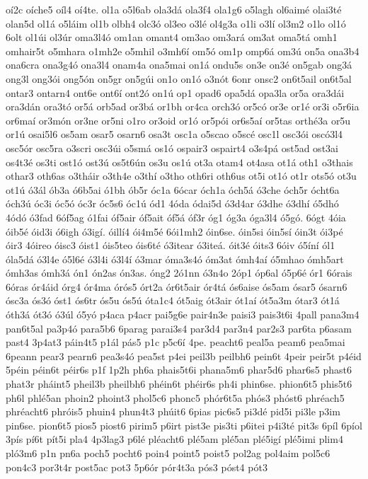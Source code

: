 {oí2c
oíche5
oíl4
oí4te.
ol1a
o5l6ab
ola3dá
ola3f4
ola1g6
o5lagh
ol6aimé
olai3té
olan5d
ol1á
o5láim
ol1b
olbh4
olc3ó
ol3eo
o3lé
ol4g3a
o1li
o3lí
ol3m2
o1lo
ol1ó
6olt
ol1úi
ol3úr
oma3l4ó
om1an
omant4
om3ao
om3ará
om3at
oma5tá
omh1
omhair5t
o5mhara
o1mh2e
o5mhil
o3mh6í
om5ó
om1p
omp6á
om3ú
on5a
ona3b4
ona6cra
ona3g4ó
ona3l4
onam4a
ona5mai
on1á
ondu5s
on3e
on3é
on5gab
ong3á
ong3l
ong3ói
ong5ón
on5gr
on5gúi
on1o
on1ó
o3nót
6onr
onsc2
on6t5ail
on6t5al
ontar3
ontarn4
ont6e
ont6í
ont2ó
on1ú
op1
opad6
opa5dá
opa3la
or5a
ora3dái
ora3dán
ora3tó
or5á
orb5ad
or3bá
or1bh
or4ca
orch3ó
or5có
or3e
or1é
or3i
o5r6ia
or6maí
or3món
or3ne
or5ni
o1ro
or3oid
or1ó
or5pói
or6s5aí
or5tas
orthé3a
or5u
or1ú
osai5l6
os5am
osar5
osarn6
osa3t
osc1a
o5scao
o5scé
osc1l
osc3ói
oscó3l4
osc5ór
osc5ra
o3scri
osc3úi
o5smá
os1ó
ospair3
ospairt4
o3s4pá
ost5ad
ost3ai
os4t3é
os3ti
ost1ó
ost3ú
os5t6ún
os3u
os1ú
ot3a
otam4
ot4asa
ot1á
oth1
o3thais
othar3
oth6as
o3tháir
o3th4e
o3thí
o3tho
oth6ri
oth6us
ot5i
ot1ó
ot1r
ots5ó
ot3u
ot1ú
ó3ál
ób3a
ó6b5ai
ó1bh
ób5r
óc1a
6ócar
óch1a
óch5á
ó3che
óch5r
ócht6a
óch3ú
óc3i
óc5ó
óc3r
óc5s6
óc1ú
ód1
4óda
ódai5d
ó3d4ar
ó3dhe
ó3dhí
ó5dhó
4ódó
ó3fad
6óf5ag
ó1fai
óf5air
óf5ait
óf5á
óf3r
óg1
óg3a
óga3l4
ó5gó.
6ógt
4óia
óib5é
óid3i
ó6igh
ó3igí.
óillí4
ói4m5é
6ói1mh2
óin6se.
óin5si
óin5sí
óin3t
ói3pé
óir3
4óireo
óisc3
óist1
óis5teo
óis6té
ó3itear
ó3iteá.
óit3é
óits3
6óiv
ó5íní
ól1
óla5dá
ó3l4e
ó5l6é
ó3l4i
ó3l4í
ó3mar
óma3s4ó
óm3at
ómh4aí
ó5mhao
ómh5art
ómh3as
ómh3á
ón1
ón2as
ón3as.
óng2
2ó1nn
ó3n4o
2óp1
óp6al
ó5p6é
ór1
6órais
6óras
ór4áid
órg4
ór4ma
órós5
órt2a
ór6t5air
ór4tá
ós6aise
ós5am
ósar5
ósarn6
ósc3a
ós3ó
óst1
ós6tr
ós5u
ós5ú
óta1c4
ót5aig
ót3air
ót1aí
ót5a3m
ótar3
ót1á
óth3á
ót3ó
ó3úl
ó5yó
p4aca
p4acr
pai5g6e
pair4n3e
paisi3
pais3t6i
4pall
pana3m4
pan6t5al
pa3p4ó
para5b6
6parag
parai3s4
par3d4
par3n4
par2s3
par6ta
p6asam
past4
3p4at3
páin4t5
p1ál
pás5
p1c
p5c6í
4pe.
peacht6
peal5a
peam6
pea5mai
6peann
pear3
pearn6
pea3s4ó
pea5st
p4ei
peil3b
peilbh6
pein6t
4peir
peir5t
p4éid
5péin
péin6t
péir6s
p1f
1p2h
ph6a
phais5t6i
phana5m6
phar5d6
phar6s5
phast6
phat3r
pháint5
pheil3b
pheilbh6
phéin6t
phéir6s
ph4i
phin6se.
phion6t5
phis5t6
ph6l
phlé5an
phoin2
phoint3
phol5c6
phonc5
phór6t5a
phós3
phóst6
phréach5
phréacht6
phróis5
phuin4
phun4t3
phúit6
6pias
pic6s5
pi3dé
pid5i
pi3le
p3im
pin6se.
pion6t5
pios5
piost6
pirim5
p6irt
pist3e
pis3ti
p6itei
p4i3té
pit3s
6píl
6píol
3pís
pí6t
pít5i
pla4
4p3lag3
p6lé
pléacht6
plé5am
plé5an
plé5igí
plé5imi
plim4
pló3m6
p1n
pn6a
poch5
pocht6
poin4
point5
poist5
pol2ag
pol4aim
pol5c6
pon4c3
por3t4r
post5ac
pot3
5p6ór
pór4t3a
pós3
póst4
pót3
}
